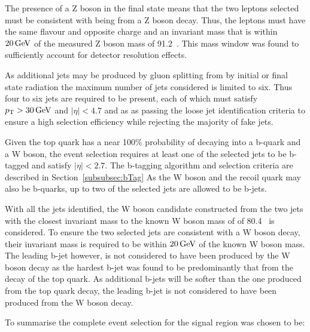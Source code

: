 The presence of a Z boson in the final state means that the two leptons selected must be consistent with being from a Z boson decay.
Thus, the leptons must have the same flavour and opposite charge and an invariant mass that is within $20\,\text{Ge\hspace{-.08em}V}$ of the measured Z boson mass of 91.2\GeV~\cite{Tanabashi:2018oca}.
This mass window was found to sufficiently account for detector resolution effects.

As additional jets may be produced by gluon splitting from by initial or final state radiation the maximum number of jets considered is limited to six.
Thus four to six jets are required to be present, each of which must satisfy $p_{\mathrm{T}} > 30\,\text{Ge\hspace{-.08em}V}$ and $|\eta| < 4.7$ and as as passing the loose jet identification criteria to ensure a high selection efficiency while rejecting the majority of fake jets.

Given the top quark has a near 100\% probability of decaying into a b-quark and a W boson, the event selection requires at least one of the selected jets to be b-tagged and satisfy $|\eta| < 2.7$.
The b-tagging algorithm and selection criteria are described in Section~\ref{subsubsec:bTag}
As the W boson and the recoil quark may also be b-quarks, up to two of the selected jets are allowed to be b-jets.

With all the jets identified, the W boson candidate constructed from the two jets with the closest invariant mass to the known W boson mass of of 80.4\GeVcc~\cite{Tanabashi:2018oca} is considered.
To ensure the two selected jets are consistent with a W boson decay, their invariant mass is required to be within $20\,\text{Ge\hspace{-.08em}V}$ of the known W boson mass.
The leading b-jet however, is not considered to have been produced by the W boson decay as the hardest b-jet was found to be predominantly that from the decay of the top quark.
As additional b-jets will be softer than the one produced from the top quark decay, the leading b-jet is not considered to have been produced from the W boson decay.

To summarise the complete event selection for the signal region was chosen to be:

